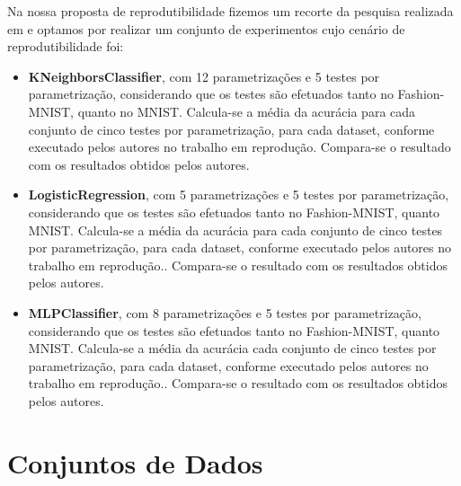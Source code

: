 \documentclass{article}
\begin{document}
Na nossa proposta de reprodutibilidade fizemos um recorte da pesquisa realizada em \cite{Xiao2017FashionMNISTAN} e optamos por realizar um conjunto de experimentos cujo cenário de reprodutibilidade foi:
\begin{itemize}
    \item \textbf{KNeighborsClassifier}, com 12 parametrizações e 5 testes por parametrização, considerando que os testes são efetuados tanto no Fashion-MNIST, quanto no MNIST. Calcula-se a média da acurácia para cada conjunto de cinco testes por parametrização, para cada dataset, conforme executado pelos autores no trabalho em reprodução. Compara-se o resultado com os resultados obtidos pelos autores.
    
    \item \textbf{LogisticRegression}, com 5 parametrizações e 5 testes por parametrização, considerando que os testes são efetuados tanto no Fashion-MNIST, quanto MNIST. Calcula-se a média da acurácia para cada conjunto de cinco testes por parametrização, para cada dataset, conforme executado pelos autores no trabalho em reprodução.. Compara-se o resultado com os resultados obtidos pelos autores.
    \item \textbf{MLPClassifier}, com 8 parametrizações e 5 testes por parametrização, considerando que os testes são efetuados tanto no Fashion-MNIST, quanto MNIST. Calcula-se a média da acurácia cada conjunto de cinco testes por parametrização, para cada dataset, conforme executado pelos autores no trabalho em reprodução.. Compara-se o resultado com os resultados obtidos pelos autores.
\end{itemize}


\section{Conjuntos de Dados}
\end{document}
